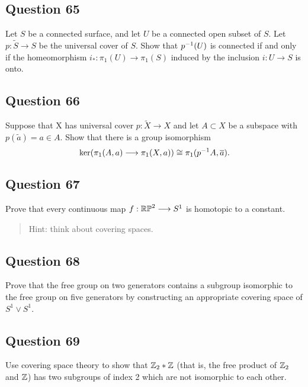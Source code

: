 \documentclass[12pt]{article}
\begin{document}
\hypertarget{question-65-3}{%
\subsection{Question 65}\label{question-65-3}}

Let \(S\) be a connected surface, and let \(U\) be a connected open
subset of \(S\). Let \(p : \tilde S \to S\) be the universal cover of
\(S\). Show that \(p^{-1} (U )\) is connected if and only if the
homeomorphism \(i_\ast : \pi_1 (U ) \to \pi_1 (S)\) induced by the
inclusion \(i : U \to S\) is onto.

\hypertarget{question-66-3}{%
\subsection{Question 66}\label{question-66-3}}

Suppose that X has universal cover \(p : \tilde X \to X\) and let
\(A \subset X\) be a subspace with \(p(\tilde a) = a \in A\). Show that
there is a group isomorphism \[
\ker(\pi_1 (A, a) \longrightarrow \pi_1 (X, a)) \cong \pi_1 (p^{-1} A, \overline{a})
.\]

\hypertarget{question-67-3}{%
\subsection{Question 67}\label{question-67-3}}

Prove that every continuous map \(f : {\mathbb{RP}}^2 \longrightarrow S^1\) is homotopic to a
constant.

\begin{quote}
Hint: think about covering spaces.
\end{quote}

\hypertarget{question-68-3}{%
\subsection{Question 68}\label{question-68-3}}

Prove that the free group on two generators contains a subgroup
isomorphic to the free group on five generators by constructing an
appropriate covering space of \(S^1 \lor S^1\).

\hypertarget{question-69-3}{%
\subsection{Question 69}\label{question-69-3}}

Use covering space theory to show that \({\mathbb{Z}}_2 \ast {\mathbb{Z}}\) (that is, the
free product of \({\mathbb{Z}}_2\) and \({\mathbb{Z}}\)) has two subgroups of index 2
which are not isomorphic to each other.
\end{document}
